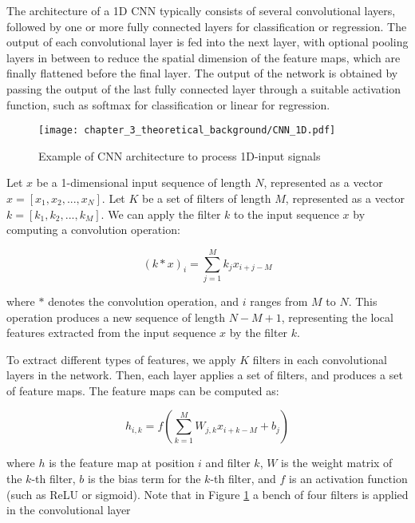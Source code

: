 The architecture of a 1D CNN typically consists of several convolutional layers, followed by one or more fully connected layers for classification or regression. The output of each convolutional layer is fed into the next layer, with optional pooling layers in between to reduce the spatial dimension of the feature maps, which are finally flattened before the final layer. The output of the network is obtained by passing the output of the last fully connected layer through a suitable activation function, such as softmax for classification or linear for regression.
 
 \begin{figure}[h]
 	\centering
 	\texttt{[image: chapter\_3\_theoretical\_background/CNN\_1D.pdf]}
 	\caption{Example of CNN architecture to process 1D-input signals}
 	\label{fig:chapter_3_theoretical_background/CNN_1D}
 \end{figure}
 
Let $x$ be a 1-dimensional input sequence of length $N$, represented as a vector $x = [x_1, x_2, ..., x_N]$. Let $K$ be a set of filters of length $M$, represented as a vector $k = [k_1, k_2, ..., k_M]$. We can apply the filter $k$ to the input sequence $x$ by computing a convolution operation:

\begin{equation}
	(k * x)_i = \sum_{j=1}^M k_j x_{i+j-M}
\end{equation}

where $*$ denotes the convolution operation, and $i$ ranges from $M$ to $N$. This operation produces a new sequence of length $N - M + 1$, representing the local features extracted from the input sequence $x$ by the filter $k$. 

To extract different types of features, we apply $K$ filters in each convolutional layers in the network. Then, each layer applies a set of filters, and produces a set of feature maps. The feature maps can be computed as:

\begin{equation}
h_{i,k} = f(\sum_{k=1}^M W_{j,k} x_{i+k-M} + b_j)
\end{equation}

where $h$ is the feature map at position $i$ and filter $k$, $W$ is the weight matrix of the $k$-th filter, $b$ is the bias term for the $k$-th filter, and $f$ is an activation function (such as ReLU or sigmoid). Note that in Figure \ref{fig:chapter_3_theoretical_background/CNN_1D} a bench of four filters is applied in the convolutional layer


